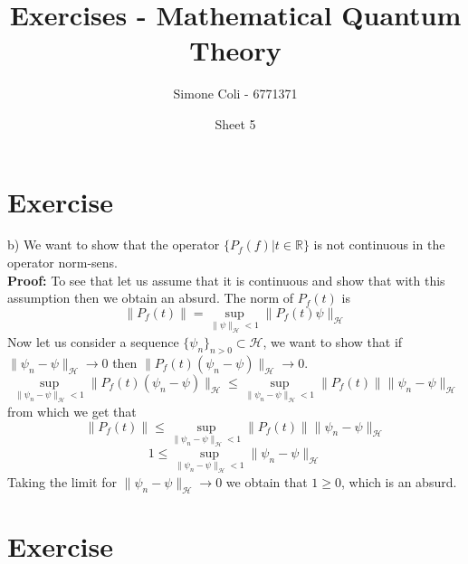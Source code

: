\documentclass{article}
\title{Exercises - Mathematical Quantum Theory}
\author{Simone Coli - 6771371}
\date{Sheet 5}
\newcommand{\R}{\mathbb{R}}
\newcommand{\1}{1\!\!1}
\newcommand{\proof}{\\ \textbf{Proof: }}
\begin{document}
\maketitle

\section{Exercise}

b) We want to show that the operator $\{P_f (f) | t \in \R\}$ is not continuous in the operator norm-sens.
\proof To see that let us assume that it is continuous and show that with this assumption then we obtain an absurd. The norm of $P_f(t)$ is
\[
    \|P_f(t)\| = \sup_{\|\psi\|_{\mathcal H} < 1} \| P_f(t) \psi \|_{\mathcal{H}}
\]
Now let us consider a sequence $\{ \psi_n \}_{n>0} \subset \mathcal H$, we want to show that if $\| \psi_n - \psi \|_\mathcal{H} \to 0$ then $\| P_f(t)(\psi_n - \psi) \|_\mathcal{H} \to 0$.
\[
    \sup_{\|\psi_n - \psi\|_{\mathcal H} < 1} \| P_f(t)(\psi_n - \psi) \|_\mathcal{H} \leq \sup_{\|\psi_n - \psi\|_{\mathcal H}<1} \| P_f(t) \| \| \psi_n - \psi \|_\mathcal{H}
\]
from which we get that
\[
    \|P_f(t)\| \leq \sup_{\|\psi_n - \psi\|_{\mathcal H}<1} \| P_f(t) \| \| \psi_n - \psi \|_\mathcal{H}
\]
\[
    1 \leq \sup_{\|\psi_n - \psi\|_{\mathcal H}<1} \| \psi_n - \psi \|_\mathcal{H}
\]
Taking the limit for $\| \psi_n - \psi \|_\mathcal{H} \to 0$ we obtain that $1 \geq 0$, which is an absurd.
\section{Exercise}
\end{document}
